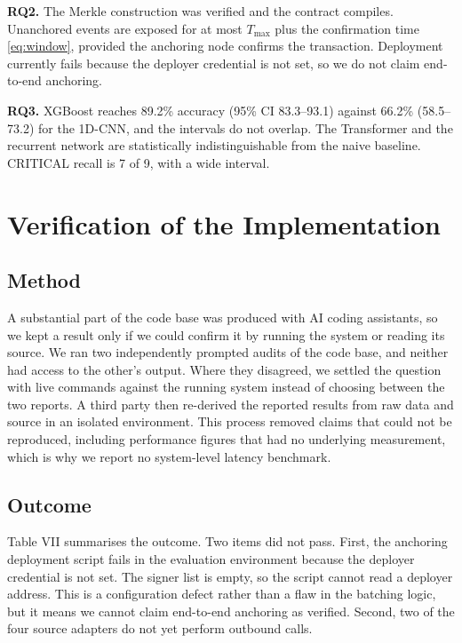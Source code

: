 \documentclass[10pt,twocolumn]{article}
\begin{document}
\textbf{RQ2.} The Merkle construction was verified and the contract compiles. Unanchored events are exposed for at most $T_{\max}$ plus the confirmation time \eqref{eq:window}, provided the anchoring node confirms the transaction. Deployment currently fails because the deployer credential is not set, so we do not claim end-to-end anchoring.

\textbf{RQ3.} XGBoost reaches 89.2\% accuracy (95\% CI 83.3--93.1) against 66.2\% (58.5--73.2) for the 1D-CNN, and the intervals do not overlap. The Transformer and the recurrent network are statistically indistinguishable from the naive baseline. CRITICAL recall is 7 of 9, with a wide interval.

\section{Verification of the Implementation}

\subsection{Method}

A substantial part of the code base was produced with AI coding assistants, so we kept a result only if we could confirm it by running the system or reading its source. We ran two independently prompted audits of the code base, and neither had access to the other's output. Where they disagreed, we settled the question with live commands against the running system instead of choosing between the two reports. A third party then re-derived the reported results from raw data and source in an isolated environment. This process removed claims that could not be reproduced, including performance figures that had no underlying measurement, which is why we report no system-level latency benchmark.

\subsection{Outcome}

Table VII summarises the outcome. Two items did not pass. First, the anchoring deployment script fails in the evaluation environment because the deployer credential is not set. The signer list is empty, so the script cannot read a deployer address. This is a configuration defect rather than a flaw in the batching logic, but it means we cannot claim end-to-end anchoring as verified. Second, two of the four source adapters do not yet perform outbound calls.
\end{document}
